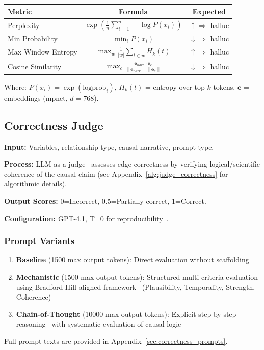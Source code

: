 \begin{table}[H]
\centering
\footnotesize
\begin{tabular}{@{}lcc@{}}
\toprule
\textbf{Metric} & \textbf{Formula} & \textbf{Expected} \\
\midrule
Perplexity & $\displaystyle\exp\left(\frac{1}{n}\sum_{i=1}^{n} -\log P(x_i)\right)$ & $\uparrow \Rightarrow$ halluc \\[1.5ex]
Min Probability & $\displaystyle\min_i P(x_i)$ & $\downarrow \Rightarrow$ halluc \\[1.5ex]
Max Window Entropy & $\displaystyle\max_w \frac{1}{|w|} \sum_{t \in w} H_k(t)$ & $\uparrow \Rightarrow$ halluc \\[1.5ex]
Cosine Similarity & $\displaystyle\max_c \frac{\mathbf{e}_{narr} \cdot \mathbf{e}_c}{\|\mathbf{e}_{narr}\| \|\mathbf{e}_c\|}$ & $\downarrow \Rightarrow$ halluc \\
\bottomrule
\end{tabular}
\end{table}

Where: $P(x_i) = \exp(\text{logprob}_i)$, $H_k(t)$ = entropy over top-$k$ tokens, $\mathbf{e}$ = embeddings (mpnet, $d=768$).

\subsection{Correctness Judge}
\label{sec:correctness_judge}

\textbf{Input:} Variables, relationship type, causal narrative, prompt type.

\textbf{Process:} LLM-as-a-judge~\cite{zheng2024llmasajudge} assesses edge correctness by verifying logical/scientific coherence of the causal claim (see Appendix~\ref{alg:judge_correctness} for algorithmic details).

\textbf{Output Scores:} 0=Incorrect, 0.5=Partially correct, 1=Correct.

\textbf{Configuration:} GPT-4.1, T=0 for reproducibility~\citep{liu2023gevalnlgevaluationusing, zheng2024judging}.

\subsubsection{Prompt Variants}
\begin{enumerate}[noitemsep]
    \item \textbf{Baseline} (1500 max output tokens): Direct evaluation without scaffolding
    \item \textbf{Mechanistic} (1500 max output tokens): Structured multi-criteria evaluation using Bradford Hill-aligned framework~\cite{shimonovich2020bradford} (Plausibility, Temporality, Strength, Coherence)
    \item \textbf{Chain-of-Thought} (10000 max output tokens): Explicit step-by-step reasoning~\cite{kojima2022large} with systematic evaluation of causal logic
\end{enumerate}
Full prompt texts are provided in Appendix~\ref{sec:correctness_prompts}.

